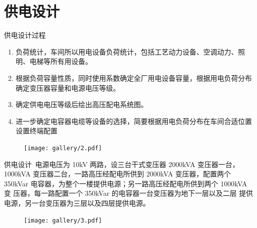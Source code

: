 \documentclass{beamer}
\begin{document}
    \section{供电设计}
    \begin{frame}{供电设计过程}{\thesection \, \secname}
        \begin{enumerate}
            \item 负荷统计，车间所以用电设备负荷统计，包括工艺动力设备、空调动力、照明、电梯等所有用设备。
            \item 根据负荷容量性质，同时使用系数确定全厂用电设备容量，根据用电负荷分布确定变压器容量和电源电压等级。
            \item 确定供电电压等级后绘出高压配电系统图。
            \item 进一步确定电容器电缆等设备的选择，简要根据用电负荷分布在车间合适位置设置终端配置
        \end{enumerate}
        \begin{figure}
            \centering
            \texttt{[image: gallery/2.pdf]}
        \end{figure}
    \end{frame}
    \begin{frame}{供电设计}{\thesection \, \secname}
        电源电压为 10kV 两路，设三台干式变压器 2000kVA 变压器一台，1000kVA
变压器二台，一路高压经配电所供到 2000kVA 变压器，配置两个 350kVar
电容器，为整个一楼提供电源；另一路高压经配电所供到两个 1000kVA 变
压器，每一路配置一个 350kVar 的电容器一台变压器为地下一层以及二层
提供电源，另一台变压器为三层以及四层提供电源。
\begin{figure}
            \centering
            \texttt{[image: gallery/3.pdf]}
        \end{figure}
    \end{frame}
\end{document}
